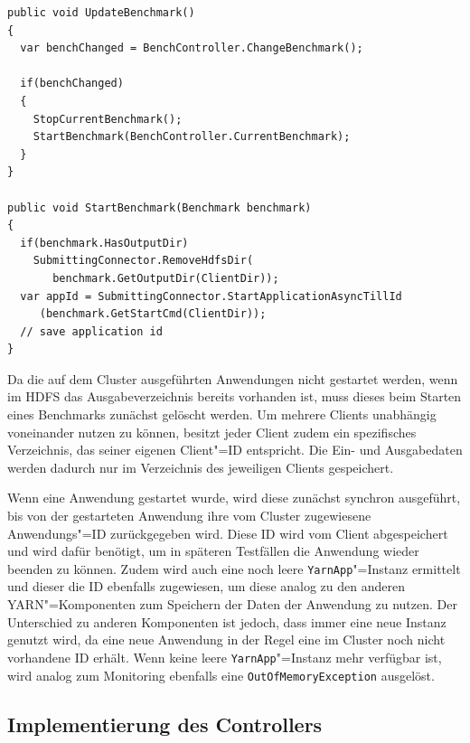 \begin{lstlisting}[label=lst:startClientBenchmark,style=cs,
caption={[Auswahl und Start des nachfolgenden Benchmarks]
    Auswahl und Start des nachfolgenden Benchmarks (gekürzt).
    Die Methode \texttt{ChangeBenchmark()} des Benchmark"=Controllers wird in \cref{subsec:selectionNextBenchmark} erläutert.}]
public void UpdateBenchmark()
{
  var benchChanged = BenchController.ChangeBenchmark();
  
  if(benchChanged)
  {
    StopCurrentBenchmark();
    StartBenchmark(BenchController.CurrentBenchmark);
  }
}

public void StartBenchmark(Benchmark benchmark)
{
  if(benchmark.HasOutputDir)
    SubmittingConnector.RemoveHdfsDir(
       benchmark.GetOutputDir(ClientDir));
  var appId = SubmittingConnector.StartApplicationAsyncTillId
     (benchmark.GetStartCmd(ClientDir));
  // save application id
}
\end{lstlisting}

Da die auf dem Cluster ausgeführten Anwendungen \uU nicht gestartet werden, wenn im HDFS das Ausgabeverzeichnis bereits vorhanden ist, muss dieses beim Starten eines Benchmarks zunächst gelöscht werden.
Um mehrere Clients unabhängig voneinander nutzen zu können, besitzt jeder Client zudem ein spezifisches Verzeichnis, das seiner eigenen Client"=ID entspricht.
Die Ein- und Ausgabedaten werden dadurch nur im Verzeichnis des jeweiligen Clients gespeichert.

Wenn eine Anwendung gestartet wurde, wird diese zunächst synchron ausgeführt, bis von der gestarteten Anwendung ihre vom Cluster zugewiesene Anwendungs"=ID zurückgegeben wird.
Diese ID wird vom Client abgespeichert und wird dafür benötigt, um in späteren Testfällen die Anwendung wieder beenden zu können.
Zudem wird auch eine noch leere \texttt{YarnApp}"=Instanz ermittelt und dieser die ID ebenfalls zugewiesen, um diese analog zu den anderen YARN"=Komponenten zum Speichern der Daten der Anwendung zu nutzen.
Der Unterschied zu anderen Komponenten ist jedoch, dass immer eine neue Instanz genutzt wird, da eine neue Anwendung in der Regel eine im Cluster noch nicht vorhandene ID erhält.
Wenn keine leere \texttt{YarnApp}"=Instanz mehr verfügbar ist, wird analog zum Monitoring ebenfalls eine \texttt{OutOfMemoryException} ausgelöst.

\subsection{Implementierung des Controllers}
\label{subsec:yarnController}

